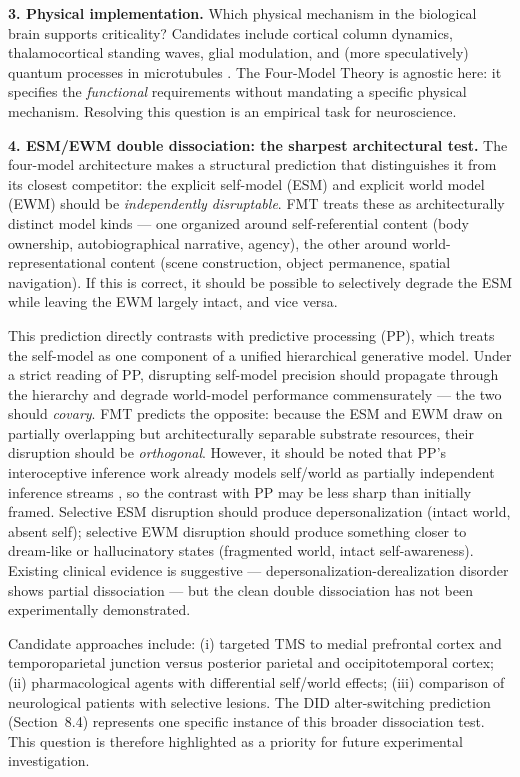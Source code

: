 \documentclass[12pt]{article}
\newcommand{\revstart}{}
\newcommand{\revend}{}
\begin{document}
\textbf{3. Physical implementation.} Which physical mechanism in the biological brain supports criticality? Candidates include cortical column dynamics, thalamocortical standing waves, glial modulation, and (more speculatively) quantum processes in microtubules \citep{PenroseHameroff1994}. The Four-Model Theory is agnostic here: it specifies the \emph{functional} requirements without mandating a specific physical mechanism. Resolving this question is an empirical task for neuroscience.

{\revstart\textbf{4. ESM/EWM double dissociation: the sharpest architectural test.} The four-model architecture makes a structural prediction that distinguishes it from its closest competitor: the explicit self-model (ESM) and explicit world model (EWM) should be \emph{independently disruptable}. FMT treats these as architecturally distinct model kinds --- one organized around self-referential content (body ownership, autobiographical narrative, agency), the other around world-representational content (scene construction, object permanence, spatial navigation). If this is correct, it should be possible to selectively degrade the ESM while leaving the EWM largely intact, and vice versa.

This prediction directly contrasts with predictive processing (PP), which treats the self-model as one component of a unified hierarchical generative model. Under a strict reading of PP, disrupting self-model precision should propagate through the hierarchy and degrade world-model performance commensurately --- the two should \emph{covary}. FMT predicts the opposite: because the ESM and EWM draw on partially overlapping but architecturally separable substrate resources, their disruption should be \emph{orthogonal}. However, it should be noted that PP's interoceptive inference work already models self/world as partially independent inference streams \citep{Seth2021}, so the contrast with PP may be less sharp than initially framed. Selective ESM disruption should produce depersonalization (intact world, absent self); selective EWM disruption should produce something closer to dream-like or hallucinatory states (fragmented world, intact self-awareness). Existing clinical evidence is suggestive --- depersonalization-derealization disorder shows partial dissociation --- but the clean double dissociation has not been experimentally demonstrated.

Candidate approaches include: (i) targeted TMS to medial prefrontal cortex and temporoparietal junction versus posterior parietal and occipitotemporal cortex; (ii) pharmacological agents with differential self/world effects; (iii) comparison of neurological patients with selective lesions. The DID alter-switching prediction (Section~8.4) represents one specific instance of this broader dissociation test. This question is therefore highlighted as a priority for future experimental investigation.\revend}
\end{document}
